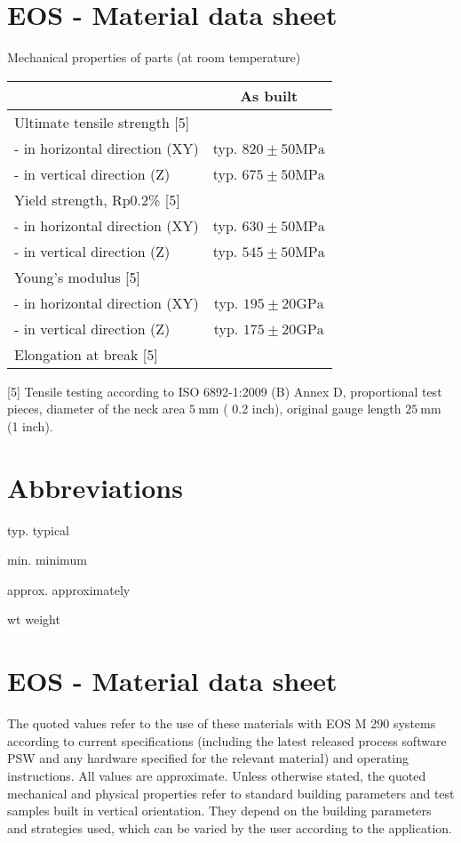\documentclass[10pt]{article}
\begin{document}
\section*{EOS - Material data sheet}
Mechanical properties of parts (at room temperature)

\begin{center}
\begin{tabular}{lc}
\hline
 & \multicolumn{1}{c}{As built} \\
\hline
Ultimate tensile strength [5] &  \\
\cline { 2 - 2 }
- in horizontal direction (XY) & typ. $820 \pm 50 \mathrm{MPa}$ \\
\cline { 2 - 2 }
- in vertical direction (Z) & typ. $675 \pm 50 \mathrm{MPa}$ \\
\hline
Yield strength, Rp0.2\% [5] &  \\
\cline { 2 - 2 }
- in horizontal direction (XY) & typ. $630 \pm 50 \mathrm{MPa}$ \\
\cline { 2 - 2 }
- in vertical direction (Z) & typ. $545 \pm 50 \mathrm{MPa}$ \\
\hline
Young's modulus [5] &  \\
\cline { 2 - 2 }
- in horizontal direction (XY) & typ. $195 \pm 20 \mathrm{GPa}$ \\
\hline
- in vertical direction (Z) & typ. $175 \pm 20 \mathrm{GPa}$ \\
\hline
Elongation at break [5] &  \\
\hline
\end{tabular}
\end{center}

[5] Tensile testing according to ISO 6892-1:2009 (B) Annex D, proportional test pieces, diameter of the neck area $5 \mathrm{~mm}$ ( 0.2 inch), original gauge length $25 \mathrm{~mm}$ (1 inch).

\section*{Abbreviations}
typ. typical

min. minimum

approx. approximately

wt weight

\section*{EOS - Material data sheet}
The quoted values refer to the use of these materials with EOS M 290 systems according to current specifications (including the latest released process software PSW and any hardware specified for the relevant material) and operating instructions. All values are approximate. Unless otherwise stated, the quoted mechanical and physical properties refer to standard building parameters and test samples built in vertical orientation. They depend on the building parameters and strategies used, which can be varied by the user according to the application.
\end{document}
